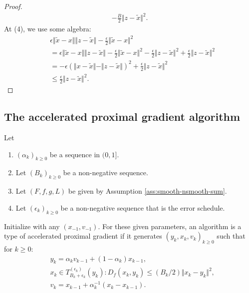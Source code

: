 \documentclass[12pt]{article}
\begin{document}
\begin{proof}
\begin{align*}
            - \frac{B}{2}\Vert z - \tilde x\Vert^2. 
        \end{align*}
        At (4), we use some algebra: 
        \begin{align*}
            &
            \epsilon \Vert \tilde x - x\Vert \Vert z - \tilde x\Vert
            - \frac{\epsilon}{2}\Vert \tilde x - x\Vert^2
            \\
            &=\epsilon \Vert \tilde x - x\Vert \Vert z - \tilde x\Vert
            - \frac{\epsilon}{2}\Vert \tilde x - x\Vert^2 - \frac{\epsilon}{2}\Vert z - \tilde x\Vert^2
            + \frac{\epsilon}{2}\Vert z - \tilde x\Vert^2
            \\
            &= 
            - \epsilon(\Vert x - \tilde x\Vert - \Vert z -\tilde x\Vert)^2 
            + \frac{\epsilon}{2}\Vert z - \tilde x\Vert^2 
            \\
            &\le \frac{\epsilon}{2}\Vert z - \tilde x\Vert^2. 
        \end{align*}
    \end{proof}
    \subsection{The accelerated proximal gradient algorithm}
        \begin{definition}\label{def:inxt-apg}
            Let 
            \begin{enumerate}[nosep]
                \item $(\alpha_k)_{k \ge 0}$ be a sequence in $(0, 1]$. 
                \item Let $(B_k)_{k \ge 0}$ be a non-negative sequence. 
                \item Let $(F, f, g, L)$ be given by Assumption \ref{ass:smooth-nsmooth-sum}. 
                \item Let $(\epsilon_k)_{k \ge 0}$ be a non-negative sequence that is the error schedule. 
            \end{enumerate}
            Initialize with any $(x_{-1}, v_{-1})$. 
            For these given parameters, an algorithm is a type of accelerated proximal gradient if it generates $(y_k, x_k, v_k)_{k \ge 0}$ such that
            for $k\ge 0$: 
            \begin{align*}
                & y_{k} = \alpha_{k} v_{k - 1} + (1 - \alpha_{k}) x_{k - 1},
                \\
                & x_k \in T_{B_k + \epsilon_k}^{(\epsilon_k)}(y_k): D_f(x_k, y_k) \le (B_k/2)\Vert x_k -  y_k\Vert^2, 
                \\
                & v_k = x_{k - 1} + \alpha_k^{-1}(x_k - x_{k - 1}).
            \end{align*}
        \end{definition}
\end{document}
